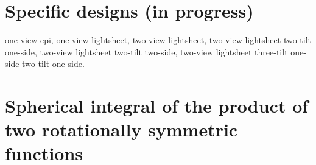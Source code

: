 \documentclass[11pt]{article}
\providecommand{\sd}{\mathbf{\hat{s}}_d}
\providecommand{\pp}{\mathbf{\hat{p}}}
\providecommand{\mh}[1]{\mathbf{\hat{#1}}}
\let\originalleft\left
\let\originalright\right
\renewcommand{\left}{\mathopen{}\mathclose\bgroup\originalleft}
\renewcommand{\right}{\aftergroup\egroup\originalright}
\begin{document}


\section{Specific designs (in progress)}
one-view epi,
one-view lightsheet,
two-view lightsheet,
two-view lightsheet two-tilt one-side,
two-view lightsheet two-tilt two-side,
two-view lightsheet three-tilt one-side two-tilt one-side.

\appendix
\section{Spherical integral of the product of two rotationally symmetric
  functions} \label{sec:spherical}
\end{document}
